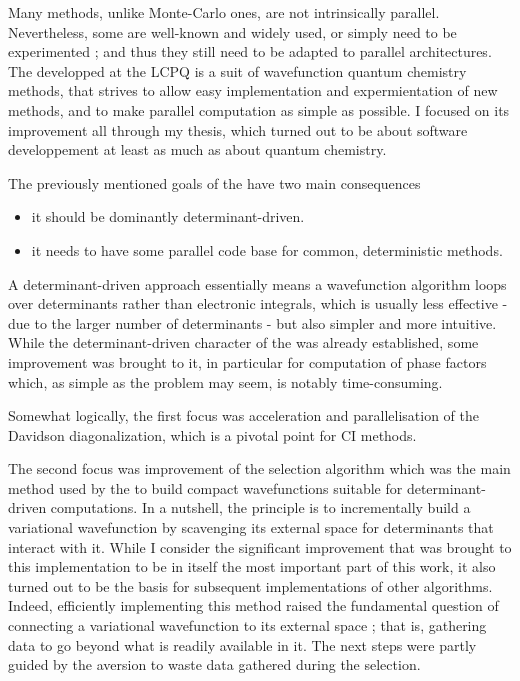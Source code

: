 \documentclass[12pt,a4paper]{report}
\begin{document}
Many methods, unlike Monte-Carlo ones, are not intrinsically parallel. Nevertheless, some are well-known and widely used, or simply need to be experimented ; and thus they still need to be adapted to parallel architectures. The \QP developped at the LCPQ is a suit of wavefunction quantum chemistry methods, that strives to allow easy implementation and expermientation of new methods, and to make parallel computation as simple as possible. I focused on its improvement all through my thesis, which turned out to be about software developpement at least as much as about quantum chemistry.

The previously mentioned goals of the \QP have two main consequences
\begin{itemize}
\item
it should be dominantly determinant-driven.
\item
it needs to have some parallel code base for common, deterministic methods.
\end{itemize}


A determinant-driven approach essentially means a wavefunction algorithm loops over determinants rather than electronic integrals, which is usually less effective - due to the larger number of determinants - but also simpler and more intuitive. While the determinant-driven character of the \QP was already established, some improvement was brought to it, in particular for computation of phase factors which, as simple as the problem may seem, is notably time-consuming.

Somewhat logically, the first focus was acceleration and parallelisation of the Davidson diagonalization, which is a pivotal point for CI methods.

The second focus was improvement of the selection algorithm which was the main method used by the \QP to build compact wavefunctions suitable for determinant-driven computations. In a nutshell, the principle is to incrementally build a variational wavefunction by scavenging its external space for determinants that interact with it. While I consider the significant improvement that was brought to this implementation to be in itself the most important part of this work, it also turned out to be the basis for subsequent implementations of other algorithms. Indeed, efficiently implementing this method raised the fundamental question of connecting a variational wavefunction to its external space ; that is, gathering data to go beyond what is readily available in it. The next steps were partly guided by the aversion to waste data gathered during the selection.
\end{document}
